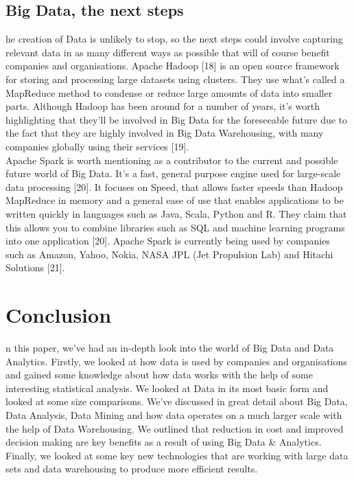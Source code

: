 \documentclass[10pt,journal,compsoc]{IEEEtran}
\begin{document}
\subsection{Big Data, the next steps}
he creation of Data is unlikely to stop, so the next steps could involve capturing relevant data in as many different ways as possible that will of course benefit companies and organisations. Apache Hadoop [18] is an open source framework for storing and processing large datasets using clusters. They use what's called a MapReduce method to condense or reduce large amounts of data into smaller parts. Although Hadoop has been around for a number of years, it's worth highlighting that they'll be involved in Big Data for the foreseeable future due to the fact that they are highly involved in Big Data Warehousing, with many companies globally using their services [19]. \\

Apache Spark is worth mentioning as a contributor to the current and possible future world of Big Data. It's a fast, general purpose engine used for large-scale data processing [20]. It focuses on Speed, that allows faster speeds than Hadoop MapReduce in memory and a general ease of use that enables applications to be written quickly in languages such as Java, Scala, Python and R. They claim that this allows you to combine libraries such as SQL and machine learning programs into one application [20]. Apache Spark is currently being used by companies such as Amazon, Yahoo, Nokia, NASA JPL (Jet Propulsion Lab) and Hitachi Solutions [21].



\section{Conclusion}
n this paper, we've had an in-depth look into the world of Big Data and Data Analytics. Firstly, we looked at how data is used by companies and organisations and gained some knowledge about how data works with the help of some interesting statistical analysis. We looked at Data in its most basic form and looked at some size comparisons. We've discussed in great detail about Big Data, Data Analysis, Data Mining and how data operates on a much larger scale with the help of Data Warehousing. We outlined that reduction in cost and improved decision making are key benefits as a result of using Big Data \& Analytics. Finally, we looked at some key new technologies that are working with large data sets and data warehousing to produce more efficient results.\\
\end{document}

